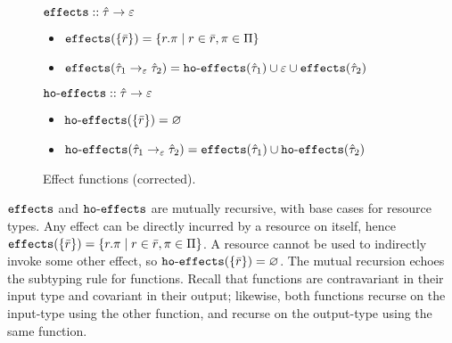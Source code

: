 \begin{figure}[h]

$\mathtt{effects} :: \hat \tau \rightarrow \varepsilon$

\begin{itemize}
	\setlength\itemsep{-0.2em}
	\item[] $\mathtt{effects}(\{ \bar r \}) = \{ r.\pi \mid r \in \bar r, \pi \in \Pi \}$
	\item[] $\mathtt{effects}(\hat \tau_1 \rightarrow_{\varepsilon} \hat \tau_2) = \mathtt{ho \hbox{-} effects}(\hat \tau_1) \cup \varepsilon \cup \mathtt{effects}(\hat \tau_2)$
\end{itemize}

$\mathtt{ho \hbox{-} effects} :: \hat \tau \rightarrow \varepsilon$

\begin{itemize}
	\setlength\itemsep{-0.2em}
	\item[] $\mathtt{ho \hbox{-} effects}(\{ \bar r \}) = \varnothing$
	\item[] $\mathtt{ho \hbox{-} effects}(\hat \tau_1 \rightarrow_{\varepsilon} \hat \tau_2) = \mathtt{effects}(\hat \tau_1) \cup \mathtt{ho \hbox{-} effects}(\hat \tau_2)$
\end{itemize}

\vspace{-7pt}
\caption{Effect functions (corrected).}
\label{fig:fx_defns}
\end{figure}

$\mathtt{effects}$ and $\mathtt{ho \hbox{-} effects}$ are mutually recursive,
with base cases for resource types. Any effect can be directly
incurred by a resource on itself, hence
$\mathtt{effects}(\{ \bar r \}) = \{ r.\pi \mid r \in \bar r, \pi \in \Pi \}$. A
resource cannot be used to indirectly invoke some other effect, so
$\mathtt{ho \hbox{-} effects}(\{ \bar r \}) = \varnothing$. The mutual recursion echoes the
subtyping rule for functions. Recall that functions are contravariant
in their input type and covariant in their output; likewise, both
functions recurse on the input-type using the other function, and
recurse on the output-type using the same function.

